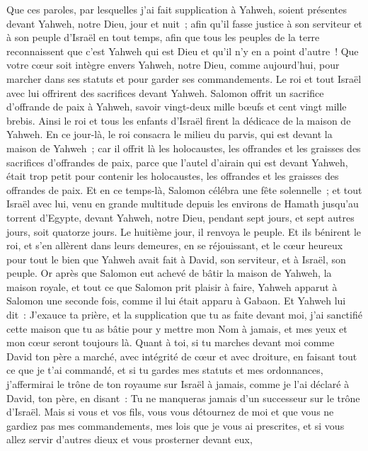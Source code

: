 \begin{multicols}{2}
Que ces paroles, par lesquelles j'ai fait supplication à Yahweh, soient présentes devant Yahweh, notre Dieu, jour et nuit~; afin qu'il fasse justice à son serviteur et à son peuple d'Israël en tout temps,
afin que tous les peuples de la terre reconnaissent que c'est Yahweh qui est Dieu et qu'il n'y en a point d'autre~!
Que votre cœur soit intègre envers Yahweh, notre Dieu, comme aujourd'hui, pour marcher dans ses statuts et pour garder ses commandements.
Le roi et tout Israël avec lui offrirent des sacrifices devant Yahweh.
Salomon offrit un sacrifice d'offrande de paix à Yahweh, savoir vingt-deux mille bœufs et cent vingt mille brebis. Ainsi le roi et tous les enfants d'Israël firent la dédicace de la maison de Yahweh.
En ce jour-là, le roi consacra le milieu du parvis, qui est devant la maison de Yahweh~; car il offrit là les holocaustes, les offrandes et les graisses des sacrifices d'offrandes de paix, parce que l'autel d'airain qui est devant Yahweh, était trop petit pour contenir les holocaustes, les offrandes et les graisses des offrandes de paix.
Et en ce temps-là, Salomon célébra une fête solennelle~; et tout Israël avec lui, venu en grande multitude depuis les environs de Hamath jusqu'au torrent d'Egypte, devant Yahweh, notre Dieu, pendant sept jours, et sept autres jours, soit quatorze jours.
Le huitième jour, il renvoya le peuple. Et ils bénirent le roi, et s'en allèrent dans leurs demeures, en se réjouissant, et le cœur heureux pour tout le bien que Yahweh avait fait à David, son serviteur, et à Israël, son peuple.
\VerseOne{}Or après que Salomon eut achevé de bâtir la maison de Yahweh, la maison royale, et tout ce que Salomon prit plaisir à faire,
Yahweh apparut à Salomon une seconde fois, comme il lui était apparu à Gabaon.
Et Yahweh lui dit~: J'exauce ta prière, et la supplication que tu as faite devant moi, j'ai sanctifié cette maison que tu as bâtie pour y mettre mon Nom à jamais, et mes yeux et mon cœur seront toujours là.
Quant à toi, si tu marches devant moi comme David ton père a marché, avec intégrité de cœur et avec droiture, en faisant tout ce que je t'ai commandé, et si tu gardes mes statuts et mes ordonnances,
j'affermirai le trône de ton royaume sur Israël à jamais, comme je l'ai déclaré à David, ton père, en disant~: Tu ne manqueras jamais d'un successeur sur le trône d'Israël.
Mais si vous et vos fils, vous vous détournez de moi et que vous ne gardiez pas mes commandements, mes lois que je vous ai prescrites, et si vous allez servir d'autres dieux et vous prosterner devant eux,

\end{multicols}
